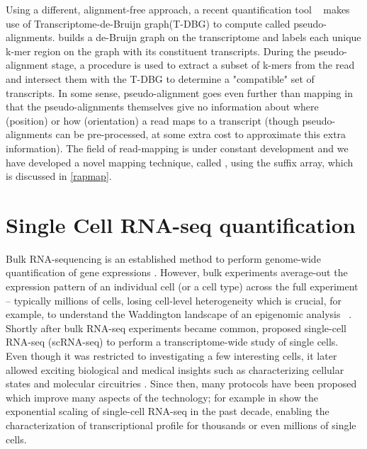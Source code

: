 Using a different, alignment-free approach, a recent quantification tool \kallisto~\citep{kallisto} makes use of Transcriptome-de-Bruijn graph(T-DBG) to compute called pseudo-alignments. \kallisto builds a de-Bruijn graph on the transcriptome and labels each unique k-mer region on the graph with its constituent transcripts. During the pseudo-alignment stage, a procedure is used to extract a subset of k-mers from the read and intersect them with the T-DBG to determine a "compatible" set of transcripts. In some sense, pseudo-alignment goes even further than mapping in that the pseudo-alignments themselves give no information about where (position) or how (orientation) a read maps to a transcript (though pseudo-alignments can be pre-processed, at some extra cost to approximate this extra information). The field of read-mapping is under constant development and we have developed a novel mapping technique, called \qm, using the suffix array, which is discussed in \cref{rapmap}.

\section{Single Cell RNA-seq quantification} 
\label{intro:singlecell}

Bulk RNA-sequencing is an established method to perform genome-wide quantification of gene expressions \citep{mortazavi2008mapping}. However, bulk experiments average-out the expression pattern of an individual cell (or a cell type) across the full experiment -- typically millions of cells, losing cell-level heterogeneity which is crucial, for example, to understand the Waddington landscape of an epigenomic analysis ~\citep{goldberg2007epigenetics}. Shortly after bulk RNA-seq experiments became common, \citet{tang2009mrna} proposed single-cell RNA-seq (scRNA-seq) to perform a transcriptome-wide study of single cells. Even though it was restricted to investigating a few interesting cells, it later allowed exciting biological and medical insights such as characterizing cellular states and molecular circuitries \citep{encode2012integrated}. Since then, many \singlecell protocols have been proposed which improve many aspects of the technology; for example in  \citep{svensson2018exponential} show the exponential scaling of single-cell RNA-seq in the past decade, enabling the characterization of transcriptional profile for thousands or even millions of single cells.

